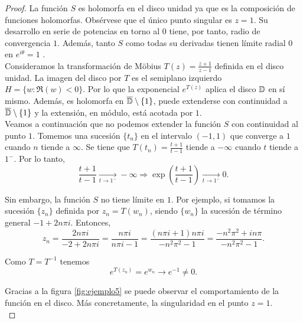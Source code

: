 \begin{proof}
    La función $S$ es holomorfa en el disco unidad ya que es la composición de funciones holomorfas. Obsérvese que el único punto singular es $z = 1$. Su desarrollo en serie de potencias en torno al $0$ tiene, por tanto, radio de convergencia $1$. Además, tanto $S$ como todas su derivadas tienen límite radial 0 en $e^{i \theta} = 1$ . \\

    Consideramos la transformación de Möbius $T(z) = \frac{z + 1}{z - 1}$ definida en el disco unidad. La imagen del disco por $T$ es el semiplano izquierdo $H = \{w: \Re (w) < 0\}$. Por lo que la exponencial $e^{T(z)}$ aplica el disco $\mathbb{D}$ en sí mismo. Además, es holomorfa en $\overline{\mathbb{D}} \setminus \{1\}$, puede extenderse con continuidad a $\overline{\mathbb{D}} \setminus \{1\}$ y la extensión, en módulo, está acotada por $1$. \\

    Veamos a continuación que no podemos extender la función $S$ con continuidad al punto $1$. Tomemos una sucesión $\{t_n\}$ en el intervalo $(-1,1)$ que converge a $1$ cuando $n$ tiende a $\infty$. Se tiene que $T(t_n)  = \frac{t + 1}{t - 1}$ tiende a $- \infty$ cuando $t$ tiende a $1^-$. Por lo tanto,
    \begin{equation*}
        \frac{t + 1}{t - 1} \xrightarrow[t \to 1^-]{}  - \infty \Rightarrow \exp \left(  \frac{t + 1}{t - 1} \right) \xrightarrow[t \to 1^-]{} 0.
    \end{equation*}

    Sin embargo, la función $S$ no tiene límite en $1$. Por ejemplo, si tomamos la sucesión $\{z_n\}$ definida por $z_n = T(w_n)$, siendo $\{w_n\}$ la sucesión de término general $-1 + 2n \pi i$. Entonces,
     \begin{equation*}
         z_n = \frac{2n \pi i}{-2 + 2n \pi i} = \frac{n \pi i}{n \pi i - 1} =  \frac{(n \pi i + 1) n \pi i}{- n^2 \pi^2 - 1} = \frac{-n^2 \pi^2 + i n \pi}{-n^2 \pi^2 - 1}.
     \end{equation*}

     Como $T = T^{-1}$ tenemos
     \begin{equation*}
         e^{T(z_n)} = e^{w_n} \to e^{-1} \not = 0.
     \end{equation*}

     Gracias a la figura \ref{fig:ejemplo5} se puede observar el comportamiento de la función en el disco. Más concretamente, la singularidad en el punto $z=1$. \\


\end{proof}

